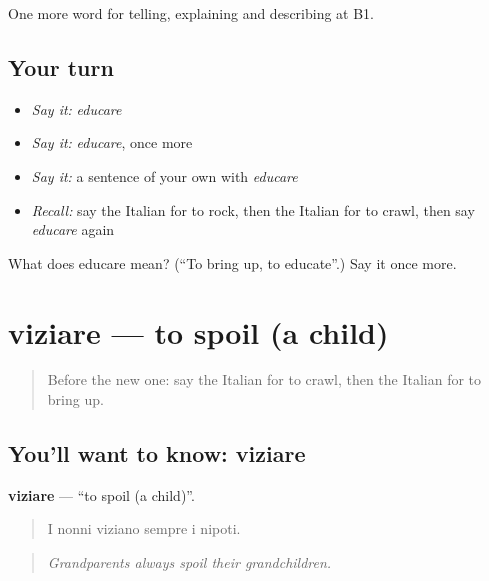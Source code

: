 \begin{grammarlens}[title={What you've built}]
One more word for telling, explaining and describing at B1.
\end{grammarlens}

\subsection*{Your turn}
\begin{itemize}
\raggedright
  \item \emph{Say it:} \emph{educare}
  \item \emph{Say it:} \emph{educare}, once more
  \item \emph{Say it:} a sentence of your own with \emph{educare}
  \item \emph{Recall:} say the Italian for to rock, then the Italian for to crawl, then say \emph{educare} again
\end{itemize}

\begin{tcolorbox}[breakable,colback=teal!4,colframe=teal!35!black,title={Before you move on}]
What does educare mean? (\textquotedblleft{}To bring up, to educate\textquotedblright{}.) Say it once more.
\end{tcolorbox}
\section[viziare]{viziare — to spoil (a child)}

\label{lesson:IT-C497-viziare}



\begin{quote}
Before the new one: say the Italian for to crawl, then the Italian for to bring up.
\end{quote}

\subsection*{You'll want to know: viziare}
\textbf{viziare} — \textquotedblleft{}to spoil (a child)\textquotedblright{}.

\begin{quote}
I nonni viziano sempre i nipoti.
\end{quote}

\begin{quote}
\emph{Grandparents always spoil their grandchildren.}
\end{quote}

